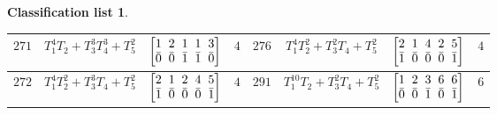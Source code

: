 \documentclass[10pt,a4paper]{amsart}
\theoremstyle{definition}
\newtheorem{class-list}[thm]{Classification list}
\numberwithin{equation}{section}
\begin{document}
\begin{class-list}
\begin{table}[h!]
\begin{tabu}{c|c|c|c||c|c|c|c}
\\
\hline
${271}$&${T_{1}^{4}T_{2}+T_{3}^{3}T_{4}^{3}+T_{5}^{2}}$
&$\arraycolsep=1mm\begin{bmatrix}{1} & {2} & {1} & {1} & {3} \\ {\bar{0}} & {\bar{0}} & {\bar{1}} & {\bar{1}} & {\bar{0}}\end{bmatrix}$&${4}$
&${276}$&${T_{1}^{4}T_{2}^{2}+T_{3}^{2}T_{4}+T_{5}^{2}}$
&$\arraycolsep=1mm\begin{bmatrix}{2} & {1} & {4} & {2} & {5} \\ {\bar{1}} & {\bar{0}} & {\bar{0}} & {\bar{0}} & {\bar{1}}\end{bmatrix}$&${4}$
\\
\hline
${272}$&${T_{1}^{4}T_{2}^{2}+T_{3}^{3}T_{4}+T_{5}^{2}}$
&$\arraycolsep=1mm\begin{bmatrix}{2} & {1} & {2} & {4} & {5} \\ {\bar{1}} & {\bar{0}} & {\bar{0}} & {\bar{0}} & {\bar{1}}\end{bmatrix}$&${4}$
&${291}$&${T_{1}^{10}T_{2}+T_{3}^{2}T_{4}+T_{5}^{2}}$
&$\arraycolsep=1mm\begin{bmatrix}{1} & {2} & {3} & {6} & {6} \\ {\bar{0}} & {\bar{0}} & {\bar{1}} & {\bar{0}} & {\bar{1}}\end{bmatrix}$&${6}$
\\
\hline
\end{tabu}%
\end{table}



\end{class-list}
\end{document}
